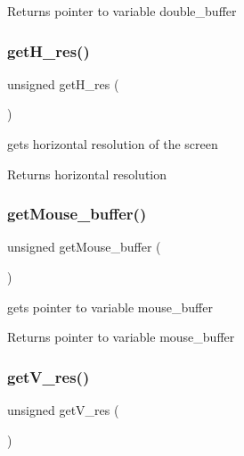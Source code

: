 \begin{DoxyReturn}{Returns}
pointer to variable double\+\_\+buffer 
\end{DoxyReturn}
\hypertarget{group__video__gr_gaf597a67a797839097222fa9b4ae20b3f}{}\label{group__video__gr_gaf597a67a797839097222fa9b4ae20b3f} 
\subsubsection{\texorpdfstring{get\+H\+\_\+res()}{getH\_res()}}
{\footnotesize\ttfamily unsigned get\+H\+\_\+res (\begin{DoxyParamCaption}{ }\end{DoxyParamCaption})}



gets horizontal resolution of the screen 

\begin{DoxyReturn}{Returns}
horizontal resolution 
\end{DoxyReturn}
\hypertarget{group__video__gr_ga80f6be1470280496d613f43fbf4f576c}{}\label{group__video__gr_ga80f6be1470280496d613f43fbf4f576c} 
\subsubsection{\texorpdfstring{get\+Mouse\+\_\+buffer()}{getMouse\_buffer()}}
{\footnotesize\ttfamily unsigned get\+Mouse\+\_\+buffer (\begin{DoxyParamCaption}{ }\end{DoxyParamCaption})}



gets pointer to variable mouse\+\_\+buffer 

\begin{DoxyReturn}{Returns}
pointer to variable mouse\+\_\+buffer 
\end{DoxyReturn}
\hypertarget{group__video__gr_ga36f1c43e43d903e085207548cf8d48a2}{}\label{group__video__gr_ga36f1c43e43d903e085207548cf8d48a2} 
\subsubsection{\texorpdfstring{get\+V\+\_\+res()}{getV\_res()}}
{\footnotesize\ttfamily unsigned get\+V\+\_\+res (\begin{DoxyParamCaption}{ }\end{DoxyParamCaption})}



